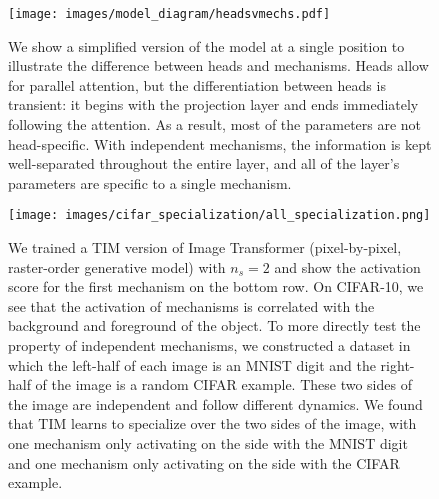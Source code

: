 \documentclass{article}
\begin{document}
\begin{figure}%
    \centering
    \texttt{[image: images/model\_diagram/headsvmechs.pdf]}
    \vspace{-1mm}
    \caption{We show a simplified version of the model at a single position to illustrate the difference between heads and mechanisms.  Heads allow for parallel attention, but the differentiation between heads is transient: it begins with the projection layer and ends immediately following the attention.  As a result, most of the parameters are not head-specific.  With independent mechanisms, the information is kept well-separated throughout the entire layer, and all of the layer's parameters are specific to a single mechanism.  }
    \label{fig:headsmechanisms}
    \vspace{-4mm}
\end{figure}

\begin{figure*}[htp!]
    \centering
    \texttt{[image: images/cifar\_specialization/all\_specialization.png]}
    \vspace{-7mm}
    \caption{We trained a TIM version of Image Transformer (pixel-by-pixel, raster-order generative model) with $n_s=2$ and show the activation score for the first mechanism on the bottom row.  On CIFAR-10, we see that the activation of mechanisms is correlated with the background and foreground of the object.  To more directly test the property of independent mechanisms, we constructed a dataset in which the left-half of each image is an MNIST digit and the right-half of the image is a random CIFAR example.  These two sides of the image are independent and follow different dynamics.  We found that TIM learns to specialize over the two sides of the image, with one mechanism only activating on the side with the MNIST digit and one mechanism only activating on the side with the CIFAR example. } %
    \label{fig:cifar_mnist_special}
    \vspace{-3mm}
\end{figure*}

\vspace{-3mm}
\end{document}
